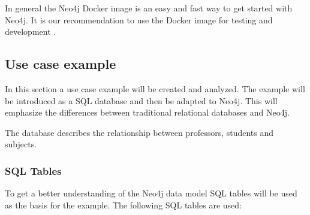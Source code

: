 In general the Neo4j Docker image is an easy and fast way to get started with
Neo4j. It is our recommendation to use the Docker image for testing and
development \parencite{neo4j:docker}.

\subsection{Use case example}

In this section a use case example will be created and analyzed. The example
will be introduced as a SQL database and then be adapted to Neo4j. This will
emphasize the differences between traditional relational databases and Neo4j.

The database describes the relationship between professors, students and
subjects.
\subsubsection{SQL Tables}
To get a better understanding of the Neo4j data model SQL tables will be used as
the basis for the example. The following SQL tables are used:

